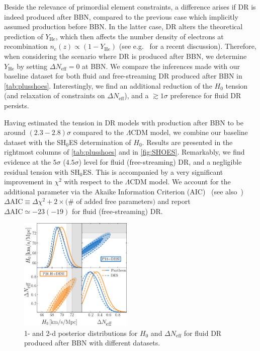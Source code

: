 \documentclass[aps,prd,twocolumn,notitlepage,
superscriptaddress,
nofootinbib,floatfix]{revtex4-2}
\newcommand{\AIC}{\Delta \textrm{AIC}}
\newcommand{\DNeff}{\Delta N_\text{eff}}
\begin{document}
Beside the relevance of primordial element constraints, a difference arises if DR is indeed produced after BBN, compared to the previous case which implicitly assumed production before BBN. In the latter case, DR alters the theoretical prediction of $Y_\text{He}$, which then affects the number density of electrons at recombination $n_e(z)\propto (1-Y_\text{He})$ (see e.g.~\cite{Cyr-Racine:2021oal} for a recent discussion). Therefore, when considering the scenario where DR is produced after BBN, we determine $Y_\text{He}$ by setting $\Delta N_\text{eff}=0$ at BBN. 
We compare the inferences made with our baseline dataset for both fluid and free-streaming DR produced after BBN in \cref{tab:plusshoes}.
Interestingly, we find an additional reduction of the $H_0$ tension (and relaxation of constraints on $\DNeff$), and a $\gtrsim 1\sigma$ preference for fluid DR persists.

Having estimated the tension in DR models with production after BBN to be around $(2.3-2.8)\sigma$ compared to the $\Lambda$CDM model, we combine our baseline dataset with the SH$_0$ES determination of $H_0$.
 Results are presented in the rightmost columns of \cref{tab:plusshoes} and in \cref{fig:SHOES}. Remarkably, we find evidence at the $5\sigma$ ($4.5\sigma$) level for fluid (free-streaming) DR, and a negligible residual tension with SH$_0$ES. This is accompanied by a very significant improvement in $\chi^2$ with respect to the $\Lambda$CDM model. We account for the additional parameter via the Akaike Information Criterion (AIC)~\cite{1100705} (see also~\cite{Liddle:2007fy}) $\AIC\equiv \Delta\chi^2 + 2\times($\# of added free parameters$)$ and report $\AIC\simeq -23(-19)$ for fluid (free-streaming) DR.



\begin{figure}
    \includegraphics[width=0.48\textwidth]{dr_after_datasets.pdf}
    \caption{ 1- and 2-d posterior distributions for $H_0$ and $\DNeff$ for fluid DR produced after BBN with different datasets.}
    \label{fig:newdata}
\end{figure}
\end{document}
